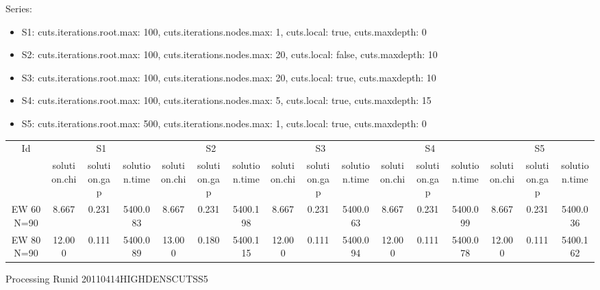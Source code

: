 \documentclass[landscape, 12pt]{report}
\begin{document}
Series:
\begin{itemize}
\item S1: cuts.iterations.root.max: 100, cuts.iterations.nodes.max: 1, cuts.local: true, cuts.maxdepth: 0
\item S2: cuts.iterations.root.max: 100, cuts.iterations.nodes.max: 20, cuts.local: false, cuts.maxdepth: 10
\item S3: cuts.iterations.root.max: 100, cuts.iterations.nodes.max: 20, cuts.local: true, cuts.maxdepth: 10
\item S4: cuts.iterations.root.max: 100, cuts.iterations.nodes.max: 5, cuts.local: true, cuts.maxdepth: 15
\item S5: cuts.iterations.root.max: 500, cuts.iterations.nodes.max: 1, cuts.local: true, cuts.maxdepth: 0
\end{itemize}
\begin{tabular}{|c|ccc|ccc|ccc|ccc|ccc|}
\hline
\multicolumn{1}{|c|}{Id} & \multicolumn{3}{|c|}{S1} & \multicolumn{3}{|c|}{S2} & \multicolumn{3}{|c|}{S3} & \multicolumn{3}{|c|}{S4} & \multicolumn{3}{|c|}{S5}
\\
 & solution.chi & solution.gap & solution.time & solution.chi & solution.gap & solution.time & solution.chi & solution.gap & solution.time & solution.chi & solution.gap & solution.time & solution.chi & solution.gap & solution.time
\\
\hline
EW 60 N=90 & 8.667 & 0.231 & 5400.083 & 8.667 & 0.231 & 5400.198 & 8.667 & 0.231 & 5400.063 & 8.667 & 0.231 & 5400.099 & 8.667 & 0.231 & 5400.036
\\
EW 80 N=90 & 12.000 & 0.111 & 5400.089 & 13.000 & 0.180 & 5400.115 & 12.000 & 0.111 & 5400.094 & 12.000 & 0.111 & 5400.078 & 12.000 & 0.111 & 5400.162
\\
\hline 
 \end{tabular}


Processing Runid 20110414HIGHDENSCUTSS5
\end{document}
